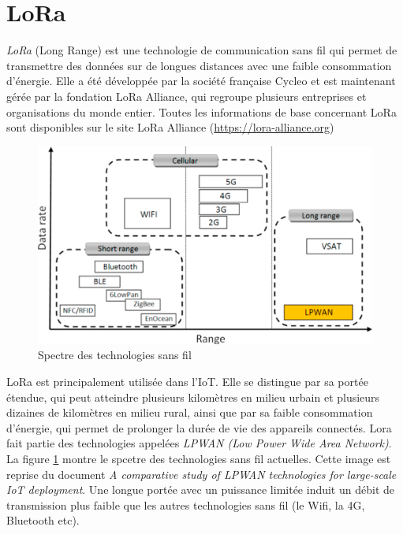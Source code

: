 \section{LoRa}

\textit{LoRa} (Long Range) est une technologie de communication sans fil qui permet de transmettre des données sur de longues distances avec une faible consommation d'énergie. Elle a été développée par la société française Cycleo et est maintenant gérée par la fondation LoRa Alliance, qui regroupe plusieurs entreprises et organisations du monde entier. Toutes les informations de base concernant LoRa sont disponibles sur le site LoRa Alliance (\href{https://lora-alliance.org}{https://lora-alliance.org})

\begin{figure}[h]
\centering

\includegraphics[scale=0.5]{images/lpwan.png}
\caption{Spectre des technologies sans fil}\label{term101}
\end{figure}


LoRa est principalement utilisée dans l'IoT. Elle se distingue par sa portée étendue, qui peut atteindre plusieurs kilomètres en milieu urbain et plusieurs dizaines de kilomètres en milieu rural, ainsi que par sa faible consommation d'énergie, qui permet de prolonger la durée de vie des appareils connectés. Lora fait partie des technologies appelées \textit{LPWAN (Low Power Wide
 Area Network)}. La figure \ref{term101} montre le spcetre des technologies sans fil actuelles. Cette image est reprise du document \textit{A comparative study of LPWAN technologies for large-scale IoT deployment}\cite{lpwan1}. Une longue portée avec un puissance limitée induit un débit de transmission plus faible que les autres technologies sans fil (le Wifi, la 4G, Bluetooth etc).

